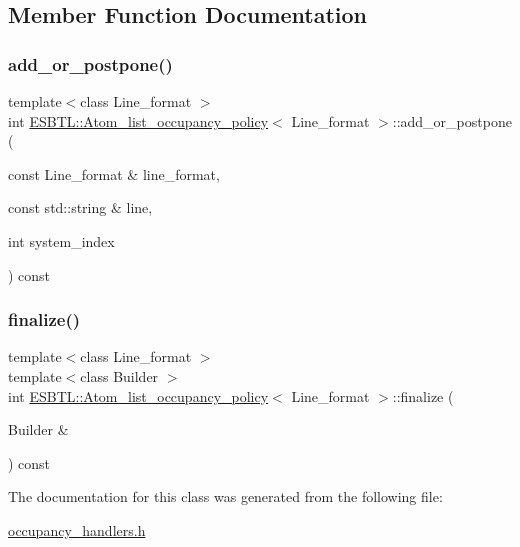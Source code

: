 \subsection{Member Function Documentation}
\mbox{\label{classESBTL_1_1Atom__list__occupancy__policy_a65617fb0659dcd05e6185f02ab6c8734}} 
\subsubsection{\texorpdfstring{add\+\_\+or\+\_\+postpone()}{add\_or\_postpone()}}
{\footnotesize\ttfamily template$<$class Line\+\_\+format $>$ \\
int \hyperlink{classESBTL_1_1Atom__list__occupancy__policy}{E\+S\+B\+T\+L\+::\+Atom\+\_\+list\+\_\+occupancy\+\_\+policy}$<$ Line\+\_\+format $>$\+::add\+\_\+or\+\_\+postpone (\begin{DoxyParamCaption}\item[{const Line\+\_\+format \&}]{line\+\_\+format,  }\item[{const std\+::string \&}]{line,  }\item[{int}]{system\+\_\+index }\end{DoxyParamCaption}) const\hspace{0.3cm}{\ttfamily [inline]}}

\mbox{\label{classESBTL_1_1Atom__list__occupancy__policy_a6e79bcfed595d2fd2dae424873f9236e}} 
\subsubsection{\texorpdfstring{finalize()}{finalize()}}
{\footnotesize\ttfamily template$<$class Line\+\_\+format $>$ \\
template$<$class Builder $>$ \\
int \hyperlink{classESBTL_1_1Atom__list__occupancy__policy}{E\+S\+B\+T\+L\+::\+Atom\+\_\+list\+\_\+occupancy\+\_\+policy}$<$ Line\+\_\+format $>$\+::finalize (\begin{DoxyParamCaption}\item[{Builder \&}]{ }\end{DoxyParamCaption}) const\hspace{0.3cm}{\ttfamily [inline]}}



The documentation for this class was generated from the following file\+:\begin{DoxyCompactItemize}
\item 
\hyperlink{occupancy__handlers_8h}{occupancy\+\_\+handlers.\+h}\end{DoxyCompactItemize}
